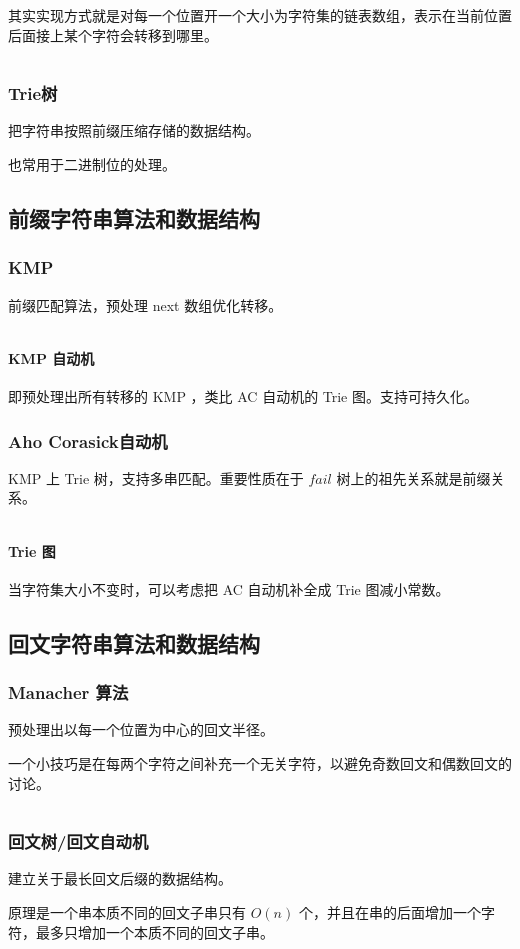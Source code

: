 \documentclass[UTF-8]{ctexart}
\newcommand{\cpp}[1]{\inputminted[bgcolor=bg,breaklines,breakanywhere=true]{c++}{#1}}
\begin{document}
			其实实现方式就是对每一个位置开一个大小为字符集的链表数组，表示在当前位置后面接上某个字符会转移到哪里。
			\cpp{code//String//seqauto.cpp}
			\subsubsection{Trie树}
			把字符串按照前缀压缩存储的数据结构。
	
			也常用于二进制位的处理。
		\subsection{前缀字符串算法和数据结构}
			\subsubsection{KMP}
			前缀匹配算法，预处理 next 数组优化转移。
			\cpp{code//String//kmp.cpp}
			\paragraph{KMP 自动机} 即预处理出所有转移的 KMP ，类比 AC 自动机的 Trie 图。支持可持久化。
			\subsubsection{Aho Corasick自动机}
			KMP 上 Trie 树，支持多串匹配。重要性质在于 $fail$ 树上的祖先关系就是前缀关系。
			\cpp{code//String//aho.cpp}
			\paragraph{Trie 图} 当字符集大小不变时，可以考虑把 AC 自动机补全成 Trie 图减小常数。
		\subsection{回文字符串算法和数据结构}
			\subsubsection{Manacher 算法}
			预处理出以每一个位置为中心的回文半径。
			
			一个小技巧是在每两个字符之间补充一个无关字符，以避免奇数回文和偶数回文的讨论。
			\cpp{code//String//manacher.cpp}
			\subsubsection{回文树/回文自动机}
			建立关于最长回文后缀的数据结构。
			
			原理是一个串本质不同的回文子串只有 $O(n)$ 个，并且在串的后面增加一个字符，最多只增加一个本质不同的回文子串。
			
\end{document}
